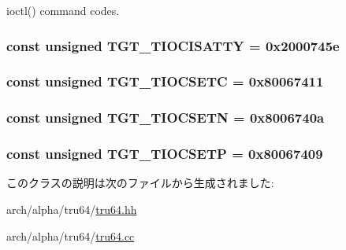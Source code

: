 ioctl() command codes. \hypertarget{classAlphaTru64_a0b4908f73bde5fcd2ce5ea35f6c3786f}{
\subsubsection[{TGT\_\-TIOCISATTY}]{\setlength{\rightskip}{0pt plus 5cm}const unsigned {\bf TGT\_\-TIOCISATTY} = 0x2000745e}}
\label{classAlphaTru64_a0b4908f73bde5fcd2ce5ea35f6c3786f}
\hypertarget{classAlphaTru64_a98595955a801e37d1d5be450c203afe5}{
\subsubsection[{TGT\_\-TIOCSETC}]{\setlength{\rightskip}{0pt plus 5cm}const unsigned {\bf TGT\_\-TIOCSETC} = 0x80067411}}
\label{classAlphaTru64_a98595955a801e37d1d5be450c203afe5}
\hypertarget{classAlphaTru64_a6783bea53088dc89157c39a9a7c71988}{
\subsubsection[{TGT\_\-TIOCSETN}]{\setlength{\rightskip}{0pt plus 5cm}const unsigned {\bf TGT\_\-TIOCSETN} = 0x8006740a}}
\label{classAlphaTru64_a6783bea53088dc89157c39a9a7c71988}
\hypertarget{classAlphaTru64_a194059e48b091a80833c40b500e70bec}{
\subsubsection[{TGT\_\-TIOCSETP}]{\setlength{\rightskip}{0pt plus 5cm}const unsigned {\bf TGT\_\-TIOCSETP} = 0x80067409}}
\label{classAlphaTru64_a194059e48b091a80833c40b500e70bec}


このクラスの説明は次のファイルから生成されました:\begin{DoxyCompactItemize}
\item 
arch/alpha/tru64/\hyperlink{arch_2alpha_2tru64_2tru64_8hh}{tru64.hh}\item 
arch/alpha/tru64/\hyperlink{tru64_8cc}{tru64.cc}\end{DoxyCompactItemize}
